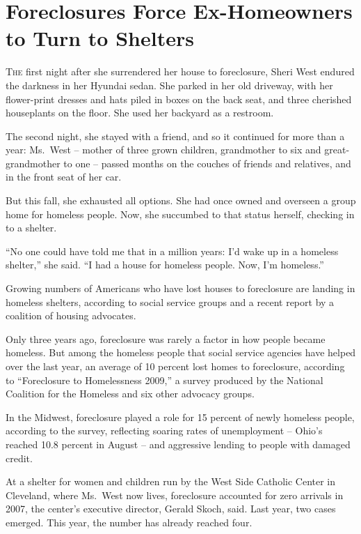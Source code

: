 ﻿\documentclass[12pt]{article}
\begin{document}
\section{Foreclosures Force Ex-Homeowners to Turn to Shelters}

\lettrine{T}{he} first night after she surrendered her house to foreclosure,
Sheri West endured the darkness in her Hyundai sedan. She parked in her old driveway, with her
flower-print dresses and hats piled in boxes on the back seat, and three cherished houseplants on
the floor. She used her backyard as a restroom.

The second night, she stayed with a friend, and so it continued for more than a year: Ms.~West --
mother of three grown children, grandmother to six and great-grandmother to one -- passed months on
the couches of friends and relatives, and in the front seat of her car.

But this fall, she exhausted all options. She had once owned and overseen a group home for homeless
people. Now, she succumbed\cite{succumb} to that status herself, checking in to a shelter.

``No one could have told me that in a million years: I'd wake up in a homeless shelter,'' she said.
``I had a house for homeless people. Now, I'm homeless.''

Growing numbers of Americans who have lost houses to foreclosure are landing in homeless shelters,
according to social service groups and a recent report by a coalition of housing advocates.

Only three years ago, foreclosure was rarely a factor in how people became homeless. But among the
homeless people that social service agencies have helped over the last year, an average of 10
percent lost homes to foreclosure, according to ``Foreclosure to Homelessness 2009,'' a survey
produced by the National Coalition for the Homeless and six other advocacy groups.

In the Midwest, foreclosure played a role for 15 percent of newly homeless people, according to the
survey, reflecting soaring rates of unemployment -- Ohio's reached 10.8 percent in August -- and
aggressive lending to people with damaged credit.

At a shelter for women and children run by the West Side Catholic Center in Cleveland, where
Ms.~West now lives, foreclosure accounted for zero arrivals in 2007, the center's executive
director, Gerald Skoch, said. Last year, two cases emerged. This year, the number has already
reached four.
\end{document}
